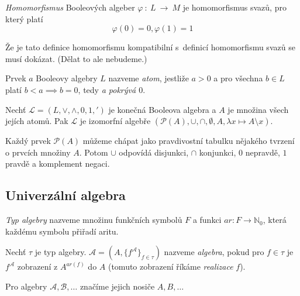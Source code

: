 \begin{definition}[Homomorfismus]
    {\em Homomorfismus} Booleových algeber $\varphi~\colon~L~\to~M$
    je homomorfismus svazů, pro který platí
    \[
    \varphi(0) = 0, \varphi(1) = 1
    \]
\end{definition}

Že je tato definice homomorfismu kompatibilní s~definicí homomorfismu
svazů se musí dokázat. (Dělat to ale nebudeme.)

\begin{definition}[Atom]
    Prvek $a$ Booleovy algebry $L$ nazveme {\em atom}, jestliže
    $a > 0$ a pro všechna $b \in L$ platí $b < a \implies b = 0$,
    tedy {\em a pokrývá $0$}.
\end{definition}

\begin{theorem}
    Nechť $\mathcal{L} = (L, \vee, \wedge, 0, 1, {'})$
    je konečná Booleova algebra
    \linebreak
    a $A$ je množina všech jejích atomů.
    Pak $\mathcal{L}$ je izomorfní algebře
    \linebreak
    $(\mathcal{P}(A), \cup, \cap, \emptyset, A, \lambda x \mapsto A \setminus x)$.
\end{theorem}

Každý prvek $\mathcal{P}(A)$ můžeme chápat jako pravdivostní tabulku
nějakého tvrzení o prvcích množiny $A$. Potom $\cup$ odpovídá
disjunkci, $\cap$ konjunkci, $0$ nepravdě, $1$ pravdě a komplement
negaci.

\subsection{Univerzální algebra}

\begin{definition}
    {\em Typ algebry} nazveme množinu funkčních symbolů $F$ a
    funkci $ar : F \to \mathbb{N}_0$, která každému symbolu přiřadí aritu.
\end{definition}

\begin{definition}[Algebra]
    Nechť $\tau$ je typ algebry.
    $\mathcal{A} = (A, \{ f^\mathcal{A} \}_{f \in \tau})$
    nazveme {\em algebra}, pokud pro $f \in \tau$ je
    $f^\mathcal{A}$ zobrazení z $A^{ar(f)}$ do $A$ (tomuto zobrazení
    říkáme {\em realizace} $f$).
\end{definition}

Pro algebry $\mathcal{A}, \mathcal{B}, \ldots$ značíme jejich nosiče $A,
B, \ldots$


